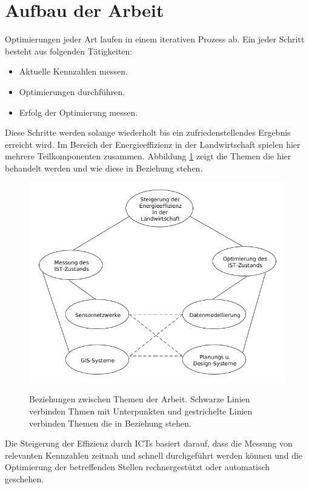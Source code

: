 \section{Aufbau der Arbeit}

Optimierungen jeder Art laufen in einem iterativen Prozess ab. Ein jeder Schritt besteht aus folgenden Tätigkeiten: 

\begin{itemize}
	\item Aktuelle Kennzahlen messen.
	\item Optimierungen durchführen.
	\item Erfolg der Optimierung messen.
\end{itemize}

Diese Schritte werden solange wiederholt bis ein zufriedenstellendes Ergebnis erreicht wird. Im Bereich der Energieeffizienz in der Landwirtschaft spielen hier mehrere Teilkomponenten zusammen. Abbildung \ref{fig:topic_overview} zeigt die Themen die hier behandelt werden und wie diese in Beziehung stehen.

\begin{figure}[h]
 \includegraphics[scale=0.65,natwidth=\textwidth]{figures/introduction/topic_overview.png}
 \centering
 \label{fig:topic_overview}
 \caption{Beziehungen zwischen Themen der Arbeit. Schwarze Linien verbinden Thmen mit Unterpunkten und gestrichelte Linien verbinden Themen die in Beziehung stehen.}
\end{figure}

Die Steigerung der Effizienz durch ICTs basiert darauf, dass die Messung von relevanten Kennzahlen zeitnah und schnell durchgeführt werden können und die Optimierung der betreffenden Stellen rechnergestützt oder automatisch geschehen.

